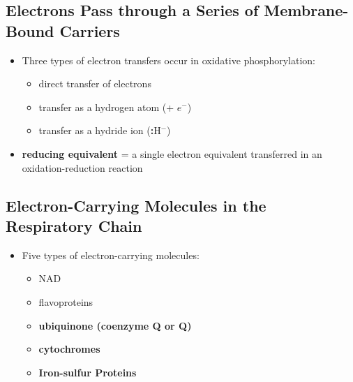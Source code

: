 \documentclass[10pt]{article}
\newcommand{\proton}{\text{H$^+$}}
\begin{document}
\subsection*{Electrons Pass through a Series of Membrane-Bound Carriers}
\begin{itemize}
	\item Three types of electron transfers occur in oxidative phosphorylation:
	\begin{itemize}
        \item direct transfer of electrons
        \item transfer as a hydrogen atom (\proton + $e^-$)
        \item transfer as a hydride ion (\textbf{:}H$^-$)
    \end{itemize}
    \item \textbf{reducing equivalent} = a single electron equivalent transferred in an oxidation-reduction reaction
\end{itemize}

\subsection*{Electron-Carrying Molecules in the Respiratory Chain}
\begin{itemize}
	\item Five types of electron-carrying molecules:
	\begin{itemize}
        \item NAD
        \item flavoproteins
        \item \textbf{ubiquinone (coenzyme Q or Q)}
        \item \textbf{cytochromes}
        \item \textbf{Iron-sulfur Proteins}
    \end{itemize}
\end{itemize}
\end{document}
